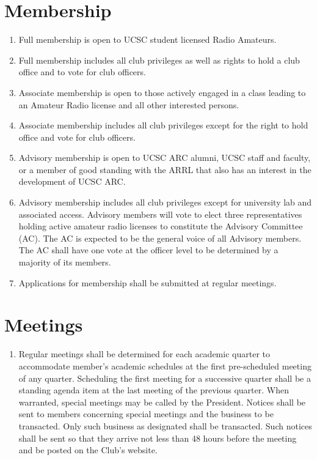 \documentclass{report}
\begin{document}
\chapter{Membership}
\begin{enumerate}

\item Full membership is open to UCSC student licensed Radio Amateurs.

\item Full membership includes all club privileges as well as rights to hold a club office and to vote for club officers.

\item Associate membership is open to those actively engaged in a class leading to an Amateur Radio license and all other interested persons.

\item Associate membership includes all club privileges except for the right to hold office and vote for club officers.

\item Advisory membership is open to UCSC ARC alumni, UCSC staff and faculty, or a member of good standing with the ARRL that also has an interest in the development of UCSC ARC.

\item Advisory membership includes all club privileges except for university lab and associated access. Advisory members will vote to elect three representatives holding active amateur radio licenses to constitute the Advisory Committee (AC). The AC is expected to be the general voice of all Advisory members. The AC shall have one vote at the officer level to be determined by a majority of its members.

\item Applications for membership shall be submitted at regular meetings.
\end{enumerate}


\chapter{Meetings}
\begin{enumerate}
\item Regular meetings shall be determined for each academic quarter to accommodate member's academic schedules at the first pre-scheduled meeting of any quarter. Scheduling the first meeting for a successive quarter shall be a standing agenda item at the last meeting of the previous quarter. When warranted, special meetings may be called by the President. Notices shall be sent to members concerning special meetings and the business to be transacted. Only such business as designated shall be transacted. Such notices shall be sent so that they arrive not less than 48 hours before the meeting and be posted on the Club's website.
\end{enumerate}
\end{document}
